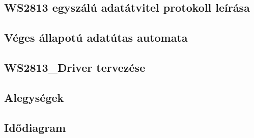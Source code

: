 \subsection{WS2813 egyszálú adatátvitel protokoll leírása}


\subsection{Véges állapotú adatútas automata}


\subsection{WS2813\_Driver tervezése}


\subsection{Alegységek}


\subsection{Idődiagram}
